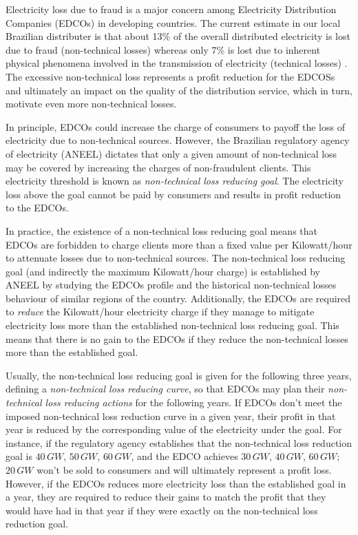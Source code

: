 Electricity loss due to fraud is a major concern among Electricity Distribution Companies (EDCOs) in developing countries. 
The current estimate in our local Brazilian distributer is that about 13\% of the overall distributed electricity is lost due to fraud (non-technical losses)
whereas only 7\% is lost due to inherent physical phenomena involved in the transmission of electricity (technical losses) \cite{ANEEL2012}. 
The excessive non-technical loss represents a profit reduction for the
EDCOSs and ultimately an impact on the quality of the distribution service, which in turn, motivate even more non-technical losses.

In principle, EDCOs could increase the charge of consumers to payoff the loss of electricity due to non-technical sources.
However, the Brazilian regulatory agency of electricity (ANEEL) dictates that only a given amount of non-technical loss
may be covered by increasing the charges of non-fraudulent clients. 
This electricity threshold is known as \textit{non-technical loss reducing goal}.
The electricity loss above the goal cannot be paid by consumers and results in 
profit reduction to the EDCOs.

In practice, the existence of a non-technical loss reducing goal means that EDCOs are forbidden to charge clients more than a fixed value per Kilowatt/hour to
attenuate losses due to non-technical sources.
The non-technical loss reducing goal (and indirectly the maximum Kilowatt/hour charge) is established by ANEEL by studying the EDCOs 
profile and the historical non-technical losses behaviour of similar regions of the country.
Additionally, the EDCOs are required to \textit{reduce} the Kilowatt/hour electricity charge if they manage to mitigate
electricity loss more than the established non-technical loss reducing goal. 
This means that there is no gain to the EDCOs if they reduce the non-technical losses more than the established goal.

Usually, the non-technical loss reducing goal is given for the following three years,
defining a \textit{non-technical loss reducing curve},
so that EDCOs may plan their \textit{non-technical loss reducing actions} for the
following years.
If EDCOs don't meet the imposed non-technical loss reduction curve in a given year, their profit in that year
is reduced by the corresponding value of the electricity under the goal. For instance, if the regulatory
agency establishes that the non-technical loss reduction goal is $40\,GW$, $50\,GW$, $60\,GW$, and the EDCO achieves $30\,GW$, $40\,GW$, $60\,GW$;
$20\,GW$ won't be sold to consumers and will ultimately represent a profit loss.
However, if the EDCOs reduces more electricity loss than the established goal in a year,
they are required to reduce their gains to match the profit that they would have had in that year if they were exactly
on the non-technical loss reduction goal.

